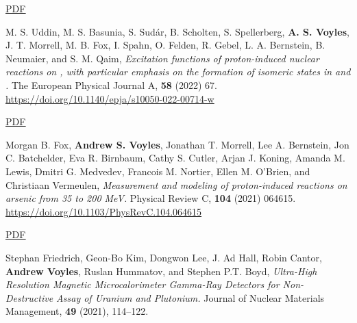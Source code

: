 \begin{bibsection}
\ifshort \vspace{0.1cm} \href{https://avoyles.github.io/papers/Kolos2022_WANDA.pdf}{\underline{PDF}} \else  \fi 

\item M. S. Uddin, M. S. Basunia, S. Sudár, B. Scholten, S. Spellerberg, \textbf{A. S. Voyles}, J. T. Morrell, M. B. Fox, I. Spahn, O. Felden, R. Gebel, L. A. Bernstein, B. Neumaier, and S. M. Qaim, \emph{Excitation functions of proton-induced nuclear reactions on , with particular emphasis on the formation of isomeric states in  and .} The European Physical Journal A, \textbf{58} (2022) 67. \\\url{https://doi.org/10.1140/epja/s10050-022-00714-w} 

\ifshort \vspace{0.1cm} \href{https://avoyles.github.io/papers/Uddin2022_86Sr.pdf}{\underline{PDF}} \else  \fi 

\item Morgan B. Fox,  \textbf{Andrew S. Voyles}, Jonathan T. Morrell,  Lee A. Bernstein, Jon C. Batchelder, Eva R. Birnbaum,  Cathy S. Cutler,  Arjan J. Koning,  Amanda M. Lewis,  Dmitri G. Medvedev, Francois M. Nortier,  Ellen M. O’Brien,  and Christiaan Vermeulen, \emph{Measurement and modeling of proton-induced reactions on arsenic from 35 to 200 MeV.} Physical Review C, \textbf{104} (2021) 064615. \\\url{https://doi.org/10.1103/PhysRevC.104.064615} 

\ifshort \vspace{0.1cm} \href{https://avoyles.github.io/papers/Fox2021_As.pdf}{\underline{PDF}} \else  \fi 


\item Stephan Friedrich, Geon-Bo Kim, Dongwon Lee, J. Ad Hall, Robin Cantor, \textbf{Andrew Voyles}, Ruslan Hummatov, and Stephen P.T. Boyd, \emph{Ultra-High Resolution Magnetic Microcalorimeter Gamma-Ray Detectors for Non-Destructive Assay of Uranium and Plutonium.} Journal of Nuclear Materials Management, \textbf{49} (2021), 114--122. 


\end{bibsection}
